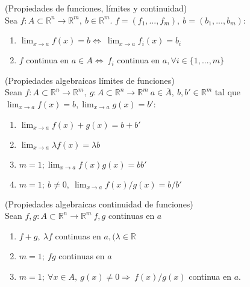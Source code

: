 \begin{prop}(Propiedades de funciones, límites y continuidad)\\
Sea $f:A\subset \mathbb{R}^n \rightarrow \mathbb{R}^m, \ b \in \mathbb{R}^m$. $f = (f_1,...,f_m), \ b = (b_1,...,b_m)$:
\begin{enumerate}[label=(\roman*)]
    \item $ \lim_{x\rightarrow a} f(x) = b \Leftrightarrow \ \lim_{x\rightarrow a} f_i(x) = b_i $ 
    \item $f$ continua en $a \in A \Leftrightarrow \ f_i$ continua en $a, \forall i \in \{1,...,m\}$  
\end{enumerate}
\end{prop}

\begin{prop}(Propiedades algebraicas límites de funciones)\\
Sean $f:A\subset \mathbb{R}^n \rightarrow \mathbb{R}^m, \ g:A\subset \mathbb{R}^n \rightarrow \mathbb{R}^m \ a \in \overline{A},\ b,b' \in \mathbb{R}^m$ tal que \\ $\lim_{x\rightarrow a} f(x) = b, \lim_{x\rightarrow a} g(x) = b'$:

\begin{enumerate}[label=(\roman*)]
    \item $\lim_{x\rightarrow a} f(x) + g(x) = b + b'$
    \item $\lim_{x\rightarrow a} \lambda f(x) = \lambda b$
    \item $m = 1; \lim_{x\rightarrow a} f(x)g(x) = bb'$
    \item $m = 1;\ b \neq 0, \ \lim_{x\rightarrow a} f(x)/g(x) = b/b'$
\end{enumerate}
\end{prop}

\begin{prop}(Propiedades algebraicas continuidad de funciones)\\
Sean $f,g:A\subset \mathbb{R}^n \rightarrow \mathbb{R}^m \ f,g$ continuas en $a$

\begin{enumerate}[label=(\roman*)]
    \item $f+g, \ \lambda f$ continuas en $a, (\lambda \in \mathbb{R}$
    \item $m = 1; \ fg$ continuas en $a$
    \item $m = 1; \ \forall x \in A, \ g(x) \neq 0 \Rightarrow \ f(x)/g(x) $ continua en $a$.
\end{enumerate}
\end{prop}

